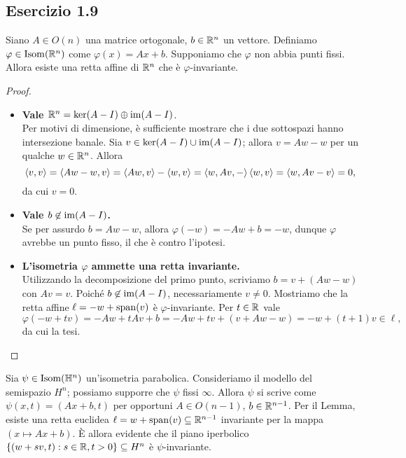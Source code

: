 \subsection*{Esercizio 1.9}
\begin{lemma*}
Siano $A\in O(n)$ una matrice ortogonale, $b\in\mathbb{R}^n$ un vettore. Definiamo $\varphi\in\operatorname{Isom}(\mathbb{R}^n)$ come $\varphi(x)=Ax+b$. Supponiamo che $\varphi$ non abbia punti fissi. Allora esiste una retta affine di $\mathbb{R}^n$ che è $\varphi$-invariante.
\end{lemma*}
\begin{proof}\leavevmode
\begin{itemize}
\item\textbf{Vale $\mathbb{R}^n=\ker(A-I)\oplus\operatorname{im}(A-I)$}.\\
Per motivi di dimensione, è sufficiente mostrare che i due sottospazi hanno intersezione banale. Sia $v\in\ker(A-I)\cup\operatorname{im}(A-I)$; allora $v=Aw-w$ per un qualche $w\in\mathbb{R}^n$. Allora
\[
\left\langle v,v\right\rangle=\left\langle Aw-w,v\right\rangle=\left\langle Aw,v\right\rangle-\left\langle w,v\right\rangle=\left\langle w,Av,-\right\rangle\left\langle w,v\right\rangle=\left\langle w,Av-v\right\rangle=0,
\]
da cui $v=0$.
\item\textbf{Vale $b\not\in\operatorname{im}(A-I)$.}\\
Se per assurdo $b=Aw-w$, allora $\varphi(-w)=-Aw+b=-w$, dunque $\varphi$ avrebbe un punto fisso, il che è contro l'ipotesi.
\item\textbf{L'isometria $\varphi$ ammette una retta invariante.}\\
Utilizzando la decomposizione del primo punto, scriviamo $b=v+(Aw-w)$ con $Av=v$. Poiché $b\not\in\operatorname{im}(A-I)$, necessariamente $v\neq 0$. Mostriamo che la retta affine $\ell=-w+\operatorname{span}(v)$ è $\varphi$-invariante. Per $t\in\mathbb{R}$ vale
\[
\varphi(-w+tv)=-Aw+tAv+b=-Aw+tv+(v+Aw-w)=-w+(t+1)v\in\ell,
\]
da cui la tesi.\qedhere
\end{itemize}
\end{proof}

Sia $\psi\in\operatorname{Isom}(\mathbb{H}^n)$ un'isometria parabolica. Consideriamo il modello del semispazio $H^n$; possiamo supporre che $\psi$ fissi $\infty$. Allora $\psi$ si scrive come $\psi(x,t)=(Ax+b,t)$ per opportuni $A\in O(n-1)$, $b\in\mathbb{R}^{n-1}$. Per il Lemma, esiste una retta euclidea $\ell=w+\operatorname{span}(v)\subseteq\mathbb{R}^{n-1}$ invariante per la mappa $(x\mapsto Ax+b)$. È allora evidente che il piano iperbolico $\{(w+sv,t):s\in\mathbb{R},t>0\}\subseteq H^n$ è $\psi$-invariante.